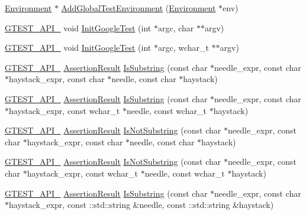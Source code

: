 \begin{DoxyCompactItemize}
\item 
\hyperlink{classtesting_1_1_environment}{Environment} $\ast$ \hyperlink{namespacetesting_a460d7b998622e332392c1e00be3a60d5}{Add\+Global\+Test\+Environment} (\hyperlink{classtesting_1_1_environment}{Environment} $\ast$env)
\item 
\hyperlink{gtest-port_8h_aa73be6f0ba4a7456180a94904ce17790}{G\+T\+E\+S\+T\+\_\+\+A\+P\+I\+\_\+} void \hyperlink{namespacetesting_aee3f6f99df893f576f705f66c0559482}{Init\+Google\+Test} (int $\ast$argc, char $\ast$$\ast$argv)
\item 
\hyperlink{gtest-port_8h_aa73be6f0ba4a7456180a94904ce17790}{G\+T\+E\+S\+T\+\_\+\+A\+P\+I\+\_\+} void \hyperlink{namespacetesting_a6e9d83553f1d10818d698d45689d8adb}{Init\+Google\+Test} (int $\ast$argc, wchar\+\_\+t $\ast$$\ast$argv)
\item 
\hyperlink{gtest-port_8h_aa73be6f0ba4a7456180a94904ce17790}{G\+T\+E\+S\+T\+\_\+\+A\+P\+I\+\_\+} \hyperlink{classtesting_1_1_assertion_result}{Assertion\+Result} \hyperlink{namespacetesting_a5c90a86562b2470213c07742e0eeb0fe}{Is\+Substring} (const char $\ast$needle\+\_\+expr, const char $\ast$haystack\+\_\+expr, const char $\ast$needle, const char $\ast$haystack)
\item 
\hyperlink{gtest-port_8h_aa73be6f0ba4a7456180a94904ce17790}{G\+T\+E\+S\+T\+\_\+\+A\+P\+I\+\_\+} \hyperlink{classtesting_1_1_assertion_result}{Assertion\+Result} \hyperlink{namespacetesting_a08ce65847491b27a38cbac3ac15e3035}{Is\+Substring} (const char $\ast$needle\+\_\+expr, const char $\ast$haystack\+\_\+expr, const wchar\+\_\+t $\ast$needle, const wchar\+\_\+t $\ast$haystack)
\item 
\hyperlink{gtest-port_8h_aa73be6f0ba4a7456180a94904ce17790}{G\+T\+E\+S\+T\+\_\+\+A\+P\+I\+\_\+} \hyperlink{classtesting_1_1_assertion_result}{Assertion\+Result} \hyperlink{namespacetesting_ab553b649b06ef2339cbd90f8dfa119f0}{Is\+Not\+Substring} (const char $\ast$needle\+\_\+expr, const char $\ast$haystack\+\_\+expr, const char $\ast$needle, const char $\ast$haystack)
\item 
\hyperlink{gtest-port_8h_aa73be6f0ba4a7456180a94904ce17790}{G\+T\+E\+S\+T\+\_\+\+A\+P\+I\+\_\+} \hyperlink{classtesting_1_1_assertion_result}{Assertion\+Result} \hyperlink{namespacetesting_a28868925c50d541c8568a540b6457e54}{Is\+Not\+Substring} (const char $\ast$needle\+\_\+expr, const char $\ast$haystack\+\_\+expr, const wchar\+\_\+t $\ast$needle, const wchar\+\_\+t $\ast$haystack)
\item 
\hyperlink{gtest-port_8h_aa73be6f0ba4a7456180a94904ce17790}{G\+T\+E\+S\+T\+\_\+\+A\+P\+I\+\_\+} \hyperlink{classtesting_1_1_assertion_result}{Assertion\+Result} \hyperlink{namespacetesting_a32718fab95b2833ab5ffc9cfc9f5c8b0}{Is\+Substring} (const char $\ast$needle\+\_\+expr, const char $\ast$haystack\+\_\+expr, const \+::std\+::string \&needle, const \+::std\+::string \&haystack)

\end{DoxyCompactItemize}
